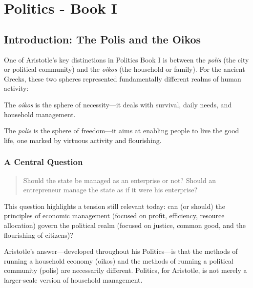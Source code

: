     \section{Politics - Book I}

        \subsection{Introduction: The Polis and the Oikos}

            One of Aristotle’s key distinctions in Politics Book I is between the \textit{polis} (the city or political community) and the \textit{oikos} (the household or family). For the ancient Greeks, these two spheres represented fundamentally different realms of human activity:
    
                \begin{definition}[oikos]
                    The \textit{oikos} is the sphere of necessity—it deals with survival, daily needs, and household management.
                \end{definition}
    
                \begin{definition}[polis]
                    The \textit{polis} is the sphere of freedom—it aims at enabling people to live the good life, one marked by virtuous activity and flourishing.
                \end{definition}

            \subsubsection{A Central Question}

                \begin{quote}
                    Should the state be managed as an enterprise or not? Should an entrepreneur manage the state as if it were his enterprise?
                \end{quote}

                This question highlights a tension still relevant today: can (or should) the principles of economic management (focused on profit, efficiency, resource allocation) govern the political realm (focused on justice, common good, and the flourishing of citizens)?
                
                Aristotle’s answer—developed throughout his Politics—is that the methods of running a household economy (oikos) and the methods of running a political community (polis) are necessarily different. Politics, for Aristotle, is not merely a larger-scale version of household management.
\newpage

